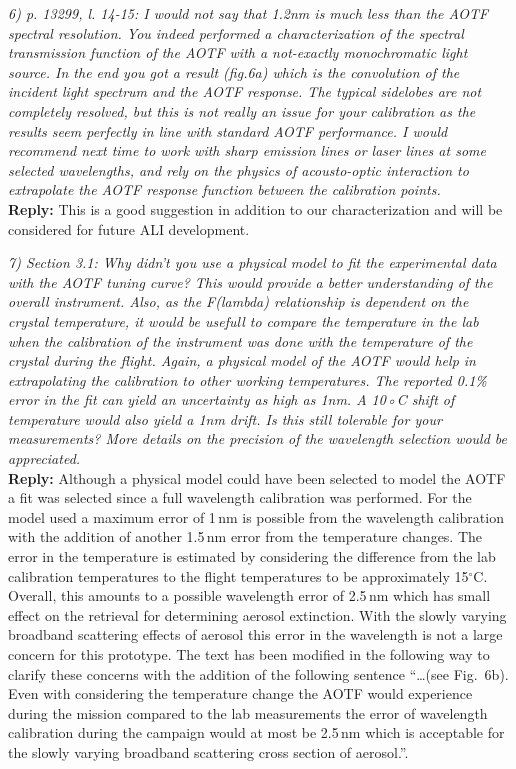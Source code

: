 \documentclass[12pt, notitlepage]{article}
\begin{document}
\hrulefill

\textit{6) p. 13299, l. 14-15: I would not say that 1.2nm is much less than the AOTF spectral
resolution. You indeed performed a characterization of the spectral transmission
function of the AOTF with a not-exactly monochromatic light source. In the end you got
a result (fig.6a) which is the convolution of the incident light spectrum and the AOTF
response. The typical sidelobes are not completely resolved, but this is not really an
issue for your calibration as the results seem perfectly in line with standard AOTF performance.
I would recommend next time to work with sharp emission lines or laser lines
at some selected wavelengths, and rely on the physics of acousto-optic interaction to
extrapolate the AOTF response function between the calibration points.}\\

\textbf{Reply:} This is a good suggestion in addition to our characterization and will be considered for future ALI development.

\hrulefill

\textit{7) Section 3.1: Why didn’t you use a physical model to fit the experimental data with
the AOTF tuning curve? This would provide a better understanding of the overall instrument.
Also, as the F(lambda) relationship is dependent on the crystal temperature,
it would be usefull to compare the temperature in the lab when the calibration of the
instrument was done with the temperature of the crystal during the flight. Again, a
physical model of the AOTF would help in extrapolating the calibration to other working
temperatures. The reported 0.1\% error in the fit can yield an uncertainty as high as
1nm. A 10◦C shift of temperature would also yield a 1nm drift. Is this still tolerable for
your measurements? More details on the precision of the wavelength selection would
be appreciated.}\\

\textbf{Reply:} Although a physical model could have been selected to model the AOTF a fit was selected since a full wavelength calibration was performed. For the model used a  maximum error of 1\,nm is possible from the wavelength calibration with the addition of another 1.5\,nm error from the temperature changes. The error in the temperature is estimated by considering the difference from the lab calibration temperatures to the flight temperatures to be approximately 15$^{\circ}$C. Overall, this amounts to a possible wavelength error of 2.5\,nm which has small effect on the retrieval for determining aerosol extinction. With the slowly varying broadband scattering effects of aerosol this error in the wavelength is not a large concern for this prototype. The text has been modified in the following way to clarify these concerns with the addition of the following sentence ``\ldots(see Fig.~6b). Even with considering the temperature change the AOTF would experience during the mission compared to the lab measurements the error of wavelength calibration during the campaign would at most be 2.5\,nm which is acceptable for the slowly varying broadband scattering cross section of aerosol.''.
\end{document}
